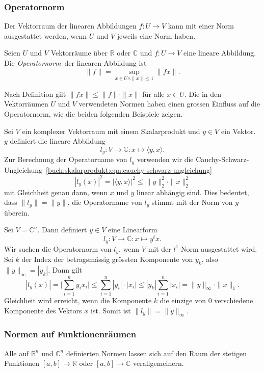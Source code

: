 \subsubsection{Operatornorm}
Der Vektorraum der linearen Abbildungen $f\colon U\to V$ kann mit einer
Norm ausgestattet werden, wenn $U$ und $V$ jeweils eine Norm haben.

\begin{definition}
\label{buch:vektoren-matrizen:def:operatornorm}
Seien $U$ und $V$ Vektorräume über $\mathbb{R}$ oder $\mathbb{C}$ und
$f\colon U\to V$ eine lineare Abbildung.
Die {\em Operatornorm} der linearen Abbildung ist 
%
\[
\|f\|
=
\sup_{x\in U\wedge \|x\|\le 1} \|fx\|.
\]
\end{definition}

Nach Definition gilt $\|fx\| \le \|f\|\cdot \|x\|$ für alle $x\in U$.
Die in den Vektorräumen $U$ und $V$ verwendeten Normen haben einen
grossen Einfluss auf die Operatornorm, wie die beiden folgenden
Beispiele zeigen.

\begin{beispiel}
Sei $V$ ein komplexer Vektorraum mit einem Skalarprodukt und $y\in V$ ein
Vektor.
$y$ definiert die lineare Abbildung
\[
l_y
\colon
V\to \mathbb{C}: x\mapsto \langle y,x\rangle.
\]
Zur Berechnung der Operatorname von $l_y$ verwenden wir die
Cauchy-Schwarz-Ungleichung~\eqref{buch:skalarprodukt:eqn:cauchy-schwarz-ungleichung}
\[
|l_y(x)|^2
=
|\langle y,x\rangle|^2
\le
\|y\|_2^2\cdot \|x\|_2^2
\]
mit Gleichheit genau dann, wenn $x$ und $y$ linear abhängig sind.
Dies bedeutet, dass
$\|l_y\|=\|y\|$, die Operatorname von $l_y$ stimmt mit der Norm von $y$
überein.
\end{beispiel}

\begin{beispiel}
Sei $V=\mathbb{C}^n$. 
Dann definiert $y\in V$ eine Linearform
\[
l_y
\colon
V\to \mathbb C
:
x\mapsto y^tx.
\]
Wir suchen  die Operatornorm von $l_y$, wenn $V$ mit der $l^1$-Norm
ausgestattet wird.
Sei $k$ der Index der betragsmässig grössten Komponente von $y_k$,
also $\| y\|_\infty = |y_k|$.
Dann gilt
\[
|l_y(x)|
=
\biggl|\sum_{i=1}^n y_ix_i\biggr|
\le
\sum_{i=1}^n |y_i|\cdot |x_i|
\le
|y_k| \sum_{i=1}^n |x_i|
=
\|y\|_\infty\cdot \|x\|_1.
\]
Gleichheit wird erreicht, wenn die Komponente $k$ die einzige
von $0$ verschiedene Komponente des Vektors $x$ ist.
Somit ist $\|l_y\| = \|y\|_\infty$.
\end{beispiel}


\subsubsection{Normen auf Funktionenräumen}
Alle auf $\mathbb{R}^n$ und $\mathbb{C}^n$ definierten Normen lassen
sich auf den Raum der stetigen Funktionen $[a,b]\to\mathbb{R}$ oder
$[a,b]\to\mathbb{C}$ verallgemeinern.

